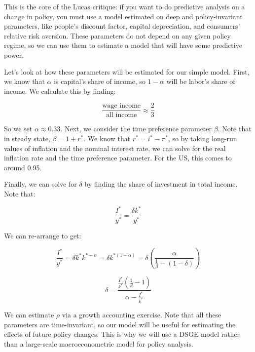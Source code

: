 \documentclass[12pt]{article}
\begin{document}
This is the core of the Lucas critique: if you want to do predictive analysis on a change in policy, you must use a model estimated on deep and policy-invariant parameters, like people's discount factor, capital depreciation, and consumers' relative risk aversion. These parameters do not depend on any given policy regime, so we can use them to estimate a model that will have some predictive power.

Let's look at how these parameters will be estimated for our simple model. First, we know that \(\alpha\) is capital's share of income, so \(1-\alpha\) will be labor's share of income. We calculate this by finding:

\[ \frac{\textrm{wage income}}{\textrm{all income}} \approx \frac{2}{3} \]

So we set \(\alpha\approx0.33\). Next, we consider the time preference parameter \(\beta\). Note that in steady state, \(\beta=1+r^*\). We know that \(r^* = i^*-\pi^*\), so by taking long-run values of inflation and the nominal interest rate, we can solve for the real inflation rate and the time preference parameter. For the US, this comes to around 0.95.

Finally, we can solve for \(\delta\) by finding the share of investment in total income. Note that: 

\[ \frac{I^*}{y^*} = \frac{\delta k^*}{y^*} \]

We can re-arrange to get:

\[ \frac{I^*}{y^*} = \delta k^* k^{* -\alpha} = \delta k^{*(1-\alpha)} = \delta \left( \frac{\alpha}{\frac{1}{\beta}-(1-\delta)} \right) \]

\[ \delta = \frac{\frac{I^*}{k^*}\left(\frac{1}{\beta}-1 \right)}{\alpha - \frac{I^*}{k^*}} \]

We can estimate \(\rho\) via a growth accounting exercise. Note that all these parameters are time-invariant, so our model will be useful for estimating the effects of future policy changes. This is why we will use a DSGE model rather than a large-scale macroeconometric model for policy analysis.
\end{document}

